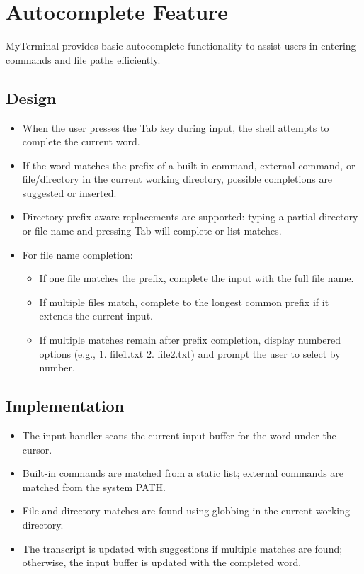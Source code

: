 \documentclass[11pt,a4paper]{article}
\begin{document}
\section{Autocomplete Feature}
MyTerminal provides basic autocomplete functionality to assist users in entering commands and file paths efficiently.

\subsection{Design}
\begin{itemize}[leftmargin=*]
  \item When the user presses the Tab key during input, the shell attempts to complete the current word.
  \item If the word matches the prefix of a built-in command, external command, or file/directory in the current working directory, possible completions are suggested or inserted.
  \item Directory-prefix-aware replacements are supported: typing a partial directory or file name and pressing Tab will complete or list matches.
  \item For file name completion:
    \begin{itemize}
      \item If one file matches the prefix, complete the input with the full file name.
      \item If multiple files match, complete to the longest common prefix if it extends the current input.
      \item If multiple matches remain after prefix completion, display numbered options (e.g., 1. file1.txt 2. file2.txt) and prompt the user to select by number.
    \end{itemize}
\end{itemize}

\subsection{Implementation}
\begin{itemize}[leftmargin=*]
  \item The input handler scans the current input buffer for the word under the cursor.
  \item Built-in commands are matched from a static list; external commands are matched from the system PATH.
  \item File and directory matches are found using globbing in the current working directory.
  \item The transcript is updated with suggestions if multiple matches are found; otherwise, the input buffer is updated with the completed word.
\end{itemize}
\end{document}
